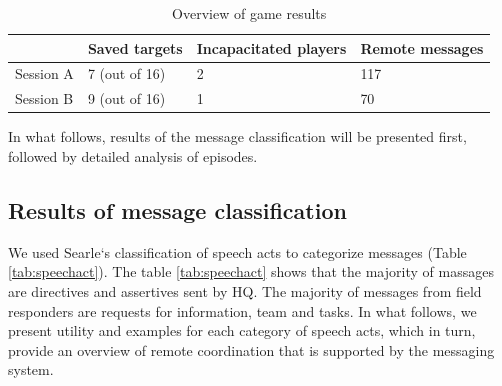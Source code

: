 \begin{table}[h]
\footnotesize
\begin{tabular}{llll}
\multicolumn{1}{l|}{} & Saved targets & Incapacitated players & Remote messages \\ \hline
\multicolumn{1}{l|}{Session A} & 7 (out of 16) & 2                    & 117             \\ 
\multicolumn{1}{l|}{Session B} & 9 (out of 16) & 1                    & 70              \\ 
\end{tabular}
\caption{Overview of game results}
\label{tab:gameResults1}
\end{table}


In what follows, results of the message classification will be presented first, followed by detailed analysis of episodes.\\


\subsection{Results of message classification}
We used Searle`s classification of speech acts to categorize messages (Table \ref{tab:speechact}). The table \ref{tab:speechact} shows that the majority of massages are directives and assertives sent by HQ. The majority of messages from field responders are requests for information, team and tasks. In what follows, we present utility and examples for each category of speech acts, which in turn, provide an overview of remote coordination that is supported by the messaging system. \\

